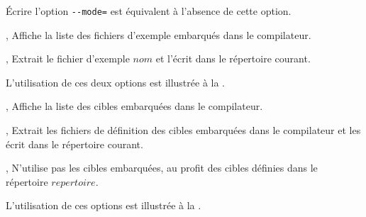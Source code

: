Écrire l'option \texttt{-{}-mode=} est équivalent à l'absence de cette option.







,  Affiche la liste des fichiers d'exemple embarqués dans le compilateur.

,  Extrait le fichier d'exemple $nom$ et l'écrit dans le répertoire courant.

L'utilisation de ces deux options est illustrée à la .







,  Affiche la liste des cibles embarquées dans le compilateur.

,  Extrait les fichiers de définition des cibles embarquées dans le compilateur et les écrit dans le répertoire courant.

,  N'utilise pas les cibles embarquées, au profit des cibles définies dans le répertoire $repertoire$.

L'utilisation de ces options est illustrée à la .
